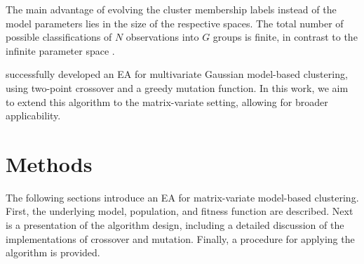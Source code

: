\documentclass[12pt]{report}
\begin{document}
The main advantage of evolving the cluster membership labels instead of the model parameters lies in the size of the respective spaces. The total number of possible classifications of $N$ observations into $G$ groups is finite, in contrast to the infinite parameter space \citep{andrews2013}.

\citet{mcnicholas2020} successfully developed an EA for multivariate Gaussian model-based clustering, using two-point crossover and a greedy mutation function. In this work, we aim to extend this algorithm to the matrix-variate setting, allowing for broader applicability.






\chapter{Methods}
The following sections introduce an EA for matrix-variate model-based clustering. First, the underlying model, population, and fitness function are described. Next is a presentation of the algorithm design, including a detailed discussion of the implementations of crossover and mutation. Finally, a procedure for applying the algorithm is provided.




\end{document}
